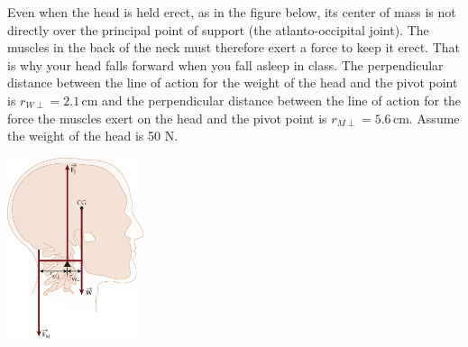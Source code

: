\documentclass[letterpaper,addpoints,answers]{exam}
\begin{document}
\begin{questions}

\pagebreak

\question
Even when the head is held erect, as in the figure below, its center of mass is not directly over the principal point of support (the atlanto-occipital joint). The muscles in the back of the neck must therefore exert a force to keep it erect. That is why your head falls forward when you fall asleep in class. The perpendicular distance between the line of action for the weight of the head and the pivot point is $r_{W\perp} = 2.1$\,cm and the perpendicular distance between the line of action for the force the muscles exert on the head and the pivot point is $r_{M\perp} = 5.6$\,cm. Assume the weight of the head is 50 N.
\begin{center}
 \includegraphics[width=0.3\textwidth]{final/head}
\end{center}



\end{questions}
\end{document}
